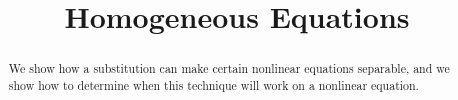 \documentclass{ximera}
\title{Homogeneous Equations}%
\begin{document}
\begin{abstract}
We show how a substitution can make certain nonlinear equations separable, and we show how to determine when this technique will work on a nonlinear equation.
\end{abstract}

\maketitle







\end{document}
